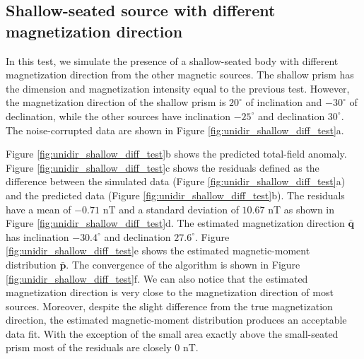 \subsection{Shallow-seated source with different magnetization direction}

In this test, we simulate the presence of a shallow-seated body with different magnetization direction from the other magnetic sources. The shallow prism has the dimension and magnetization intensity equal to the previous test. However, the magnetization direction of the shallow prism is $20^\circ$ of inclination and $-30^\circ$ of declination, while the other sources have inclination $-25^\circ$ and declination $30^\circ$. The noise-corrupted data are shown in Figure \ref{fig:unidir_shallow_diff_test}a.

Figure \ref{fig:unidir_shallow_diff_test}b shows the predicted total-field anomaly. Figure \ref{fig:unidir_shallow_diff_test}c shows the residuals defined as the difference between the simulated data (Figure \ref{fig:unidir_shallow_diff_test}a) and the predicted data (Figure \ref{fig:unidir_shallow_diff_test}b). The residuals have a mean of $-0.71$ nT and a standard deviation of $10.67$ nT as shown in Figure \ref{fig:unidir_shallow_diff_test}d. The estimated magnetization direction $\bar{\mathbf{q}}$ has inclination $-30.4^\circ$ and declination $27.6^\circ$. Figure \ref{fig:unidir_shallow_diff_test}e shows the estimated magnetic-moment distribution $\bar{\mathbf{p}}$. The convergence of the algorithm is shown in Figure \ref{fig:unidir_shallow_diff_test}f. We can also notice that the estimated magnetization direction is very close to the magnetization direction of most sources. Moreover, despite the slight difference from the true magnetization direction, the estimated magnetic-moment distribution produces an acceptable data fit. With the exception of the small area exactly above the small-seated prism most of the residuals are closely $0$ nT.  

